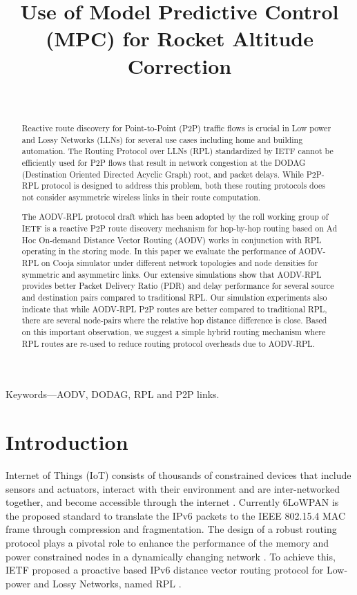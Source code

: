 \documentclass[conference, letterpaper]{IEEEtran}
\title{ Use of Model Predictive Control (MPC) for Rocket Altitude Correction }
\author{ \IEEEauthorblockN{Nikhil Peri, Anthony Lin, Manit Ginoya, Paul Buzuloiu } \
\IEEEauthorblockA{ECE Department, Indian Institute of Science \\ \{nperi104, alin
mgino, pbuzu\}@uottawa.ca} }
\begin{document}
\maketitle
\begin{abstract}

Reactive route discovery for Point-to-Point (P2P) traffic flows is crucial in
Low power and Lossy Networks (LLNs) for several use cases including home and
building automation. The Routing Protocol over LLNs (RPL) standardized by IETF
cannot be efficiently used for P2P flows that result in network congestion at
the DODAG (Destination Oriented Directed Acyclic Graph) root, and packet delays.
While P2P-RPL protocol is designed to address this problem, both these routing
protocols does not consider asymmetric wireless links in their route
computation.

The AODV-RPL protocol draft which has been adopted by the roll working group of
IETF is a reactive P2P route discovery mechanism for hop-by-hop routing based on
Ad Hoc On-demand Distance Vector Routing (AODV) works in conjunction with RPL
operating in the storing mode. In this paper we evaluate the performance of
AODV-RPL on Cooja simulator under different network topologies and node
densities for symmetric and asymmetirc links. Our extensive simulations show
that AODV-RPL provides better Packet Delivery Ratio (PDR) and delay performance
for several source and destination pairs compared to traditional RPL. Our
simulation experiments also indicate that while AODV-RPL P2P routes are better
compared to traditional RPL, there are several node-pairs where the relative hop
distance difference is close. Based on this important observation, we suggest a
simple hybrid routing mechanism where RPL routes are re-used to reduce routing
protocol overheads due to AODV-RPL.



\end{abstract}

Keywords—AODV, DODAG, RPL and P2P links.  \section{Introduction}

Internet of Things (IoT) consists of thousands of constrained devices that
include sensors and actuators, interact with their environment and are
inter-networked together, and become accessible through the internet
\cite{iot,industry,iotservey}.  Currently 6LoWPAN \cite{iotstack} is the
proposed standard to translate the IPv6 packets to the IEEE 802.15.4 MAC frame
through compression and fragmentation. The design of a robust routing protocol
plays a pivotal role to enhance the performance of the memory and power
constrained nodes in a dynamically changing network \cite{lowpan}. To achieve
this, IETF proposed a proactive based IPv6 distance vector routing protocol for
Low-power and Lossy Networks, named RPL \cite{RFC6550}.
\end{document}
